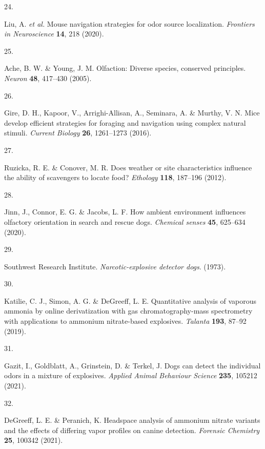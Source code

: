 \documentclass[
]{article}
\newlength{\cslhangindent}
\newlength{\csllabelwidth}
\newlength{\cslentryspacingunit} %
\newenvironment{CSLReferences}[2] %
 {%
  \setlength{\parindent}{0pt}
  \ifodd #1
  \let\oldpar\par
  \def\par{\hangindent=\cslhangindent\oldpar}
  \fi
  \setlength{\parskip}{#2\cslentryspacingunit}
 }%
 {}
\newcommand{\CSLLeftMargin}[1]{\parbox[t]{\csllabelwidth}{#1}}
\newcommand{\CSLRightInline}[1]{\parbox[t]{\linewidth - \csllabelwidth}{#1}\break}
\begin{document}
\begin{CSLReferences}{0}{0}
\leavevmode{}%
\CSLLeftMargin{24. }%
\CSLRightInline{Liu, A. \emph{et al.} Mouse navigation strategies for odor source localization. \emph{Frontiers in Neuroscience} \textbf{14}, 218 (2020).}

\leavevmode{}%
\CSLLeftMargin{25. }%
\CSLRightInline{Ache, B. W. \& Young, J. M. Olfaction: Diverse species, conserved principles. \emph{Neuron} \textbf{48}, 417--430 (2005).}

\leavevmode{}%
\CSLLeftMargin{26. }%
\CSLRightInline{Gire, D. H., Kapoor, V., Arrighi-Allisan, A., Seminara, A. \& Murthy, V. N. Mice develop efficient strategies for foraging and navigation using complex natural stimuli. \emph{Current Biology} \textbf{26}, 1261--1273 (2016).}

\leavevmode{}%
\CSLLeftMargin{27. }%
\CSLRightInline{Ruzicka, R. E. \& Conover, M. R. Does weather or site characteristics influence the ability of scavengers to locate food? \emph{Ethology} \textbf{118}, 187--196 (2012).}

\leavevmode{}%
\CSLLeftMargin{28. }%
\CSLRightInline{Jinn, J., Connor, E. G. \& Jacobs, L. F. How ambient environment influences olfactory orientation in search and rescue dogs. \emph{Chemical senses} \textbf{45}, 625--634 (2020).}

\leavevmode{}%
\CSLLeftMargin{29. }%
\CSLRightInline{Southwest Research Institute. \emph{Narcotic-explosive detector dogs}. (1973).}

\leavevmode{}%
\CSLLeftMargin{30. }%
\CSLRightInline{Katilie, C. J., Simon, A. G. \& DeGreeff, L. E. Quantitative analysis of vaporous ammonia by online derivatization with gas chromatography-mass spectrometry with applications to ammonium nitrate-based explosives. \emph{Talanta} \textbf{193}, 87--92 (2019).}

\leavevmode{}%
\CSLLeftMargin{31. }%
\CSLRightInline{Gazit, I., Goldblatt, A., Grinstein, D. \& Terkel, J. Dogs can detect the individual odors in a mixture of explosives. \emph{Applied Animal Behaviour Science} \textbf{235}, 105212 (2021).}

\leavevmode{}%
\CSLLeftMargin{32. }%
\CSLRightInline{DeGreeff, L. E. \& Peranich, K. Headspace analysis of ammonium nitrate variants and the effects of differing vapor profiles on canine detection. \emph{Forensic Chemistry} \textbf{25}, 100342 (2021).}


\end{CSLReferences}
\end{document}
